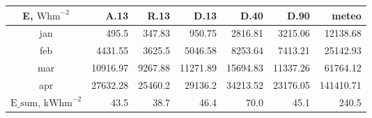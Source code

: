 \begin{tabular}{ | c | r r r r r r | }\hline
E, $\textrm{Whm}^{-2}$	&A.13	&R.13	&D.13	&D.40	&D.90	&meteo\\ \hline
jan		&495.5	&347.83	&950.75	&2816.81	&3215.06	&12138.68\\
feb		&4431.55	&3625.5	&5046.58	&8253.64	&7413.21	&25142.93\\
mar		&10916.97	&9267.88	&11271.89	&15694.83	&11337.26	&61764.12\\
apr		&27632.28	&25460.2	&29136.2	&34213.52	&23176.05	&141410.71\\ \hline
$\textrm{E_{sum}}$, $\textrm{kWhm}^{-2}$	&43.5	&38.7	&46.4	&70.0		&45.1	&240.5\\ \hline
\end{tabular}
